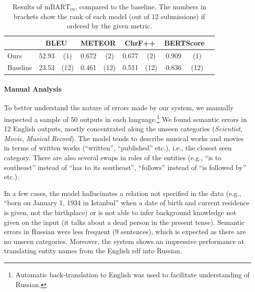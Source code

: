 \begin{table}[t]
    \footnotesize\centering
    \begin{tabular}{llcccccccc}\toprule
                 & \multicolumn{2}{c}{\bf BLEU} & \multicolumn{2}{c}{\bf METEOR} & \multicolumn{2}{c}{\bf ChrF++} & \multicolumn{2}{c}{\bf BERTScore}                               \\\midrule
        Ours     & 52.93                        & (1)                            & 0.672                          & (2)                               & 0.677 & (2)  & 0.909 & (1)  \\
        Baseline & 23.53                        & (12)                           & 0.461                          & (12)                              & 0.511 & (12) & 0.836 & (12) \\\bottomrule
    \end{tabular}
    \caption[Results of our Russian model compared to the baseline.]{Results of $\text{mBART}_{\text{ru}}$, compared to the baseline. The numbers in brackets show the rank of each model (out of 12 submissions) if ordered by the given metric.}
    \label{tab:mbart:results-ru}
\end{table}

\paragraph{Manual Analysis}
To better understand the nature of errors made by our system, we manually inspected a sample of 50 outputs in each language.\footnote{Automatic back-translation to English was used to facilitate understanding of Russian.} We found semantic errors in 12 English outputs, mostly concentrated along the unseen categories (\emph{Scientist}, \emph{Movie}, \emph{Musical Record}). The model tends to describe musical works and movies in terms of written works (``written'', ``published'' etc.), i.e., the closest seen category. There are also several swaps in roles of the entities (e.g., ``is to southeast'' instead of ``has to its southeast'', ``follows'' instead of ``is followed by'' etc.).

In a few cases, the model hallucinates a relation not specified in the data (e.g., ``born on January 1, 1934 in Istanbul'' when a date of birth and current residence is given, not the birthplace) or is not able to infer background knowledge not given on the input (it talks about a dead person in the present tense).
Semantic errors in Russian were less frequent (9 sentences), which is expected as there are no unseen categories. Moreover, the system shows an impressive performance at translating entity names from the English \ac{rdf} into Russian.

